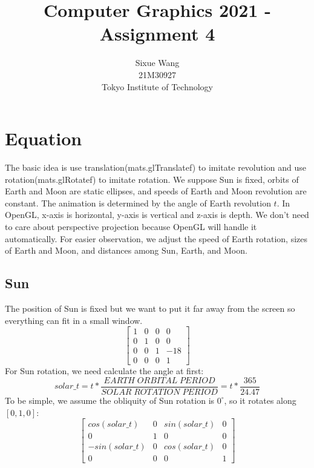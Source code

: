 \documentclass{article}
\title{Computer Graphics 2021 - Assignment 4}
\author{Sixue Wang\\21M30927\\Tokyo Institute of Technology}
\begin{document}
\maketitle

\section*{Equation}
The basic idea is use translation(mats.glTranslatef) to imitate revolution and use rotation(mats.glRotatef) to imitate rotation.
We suppose Sun is fixed,
orbits of Earth and Moon are static ellipses,
and speeds of Earth and Moon revolution are constant.
The animation is determined by the angle of Earth revolution $t$.
In OpenGL, x-axis is horizontal, y-axis is vertical and z-axis is depth.
We don't need to care about perspective projection because OpenGL will handle it automatically.
For easier observation, we adjust the speed of Earth rotation, sizes of Earth and Moon, and distances among Sun, Earth, and Moon.

\subsection*{Sun}
The position of Sun is fixed but we want to put it far away from the screen so everything can fit in a small window.
\begin{equation}
  \begin{bmatrix}
    1 & 0 & 0 & 0     \\
    0 & 1 & 0 & 0     \\
    0 & 0 & 1 & -18   \\
    0 & 0 & 0 & 1
  \end{bmatrix}
\end{equation}
For Sun rotation, we need calculate the angle at first:
\begin{equation}
  solar\_t = t * \frac{EARTH \; ORBITAL \; PERIOD}{SOLAR \; ROTATION \; PERIOD} = t * \frac{365}{24.47}
\end{equation}
To be simple, we assume the obliquity of Sun rotation is $0^{\circ}$, so it rotates along $[0, 1, 0]$:
\begin{equation}
  \begin{bmatrix}
    cos(solar\_t) & 0 & sin(solar\_t) & 0   \\
    0 & 1 & 0 & 0   \\
    -sin(solar\_t) & 0 & cos(solar\_t) & 0   \\
    0 & 0 & 0 & 1
  \end{bmatrix}
\end{equation}
\end{document}

